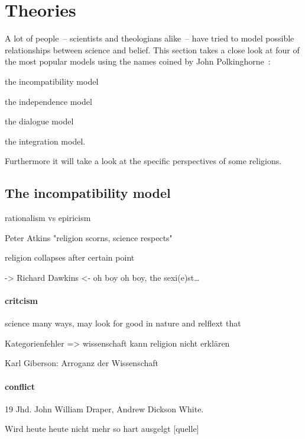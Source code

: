 \section{Theories}
\label{sec:Theories}
A lot of people~-- scientists and theologians alike~-- have tried to model possible relationships between science and belief.
This section takes a close look at four of the most popular models using the names coined by John Polkinghorne~\cite{barbour2000science,Polkinghorne1998,Peacocke1981}: \begin{inlist}
    \item the incompatibility model
    \item the independence model
    \item the dialogue model
    \item the integration model.
\end{inlist}
Furthermore it will take a look at the specific perspectives of some religions.

\def\modelpreview#1{\subsection[The #1 model]{The #1 model\hfill{}}}

\modelpreview{incompatibility}

rationalism vs epiricism

Peter Atkins "religion scorns, science respects"

religion collapses after certain point

-> Richard Dawkins <- oh boy oh boy, the sexi(e)st\ldots

\paragraph{critcism}


science many ways, may look for good in nature and relflext that

Kategorienfehler => wissenschaft kann religion nicht erklären

Karl Giberson: Arroganz der Wissenschaft

\paragraph{conflict}
19 Jhd. John William Draper, Andrew Dickson White.

Wird heute heute nicht mehr so hart ausgelgt [quelle]

